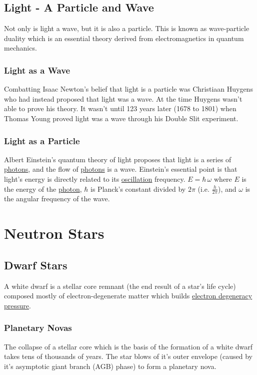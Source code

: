 \documentclass{article}
\begin{document}
\subsection{Light - A Particle and Wave}
Not only is light a wave, but it is also a particle. This is known as wave-particle duality which is an essential theory derived from electromagnetics in quantum mechanics.

\subsubsection{Light as a Wave}
Combatting Isaac Newton's belief that light is a particle was Christiaan Huygens who had instead proposed that light was a wave. At the time Huygens wasn't able to prove his theory. It wasn't until 123 years later (1678 to 1801) when Thomas Young proved light was a wave through his Double Slit experiment.

\subsubsection{Light as a Particle}
Albert Einstein's quantum theory of light proposes that light is a series of \hyperref[sec:photons]{photons}, and the flow of \hyperref[sec:photons]{photons} is a wave. Einstein's essential point is that light's energy is directly related to its \hyperref[sec:oscillation]{oscillation} frequency. $E = \hbar\,\omega$ where $E$ is the energy of the \hyperref[sec:photons]{photon}, $\hbar$ is Planck's constant divided by $2\pi$ (i.e. $\frac{h}{2\pi}$), and $\omega$ is the angular frequency of the wave.


\section{Neutron Stars}

\subsection{Dwarf Stars}
A white dwarf is a stellar core remnant (the end result of a star's life cycle) composed mostly of electron-degenerate matter which builds \hyperref[sec:electron_degeneracy_pressure]{electron degeneracy pressure}.

\subsubsection{Planetary Novas}
The collapse of a stellar core which is the basis of the formation of a white dwarf takes tens of thousands of years. The star blows of it's outer envelope (caused by it's asymptotic giant branch (AGB) phase) to form a planetary nova.
\end{document}
